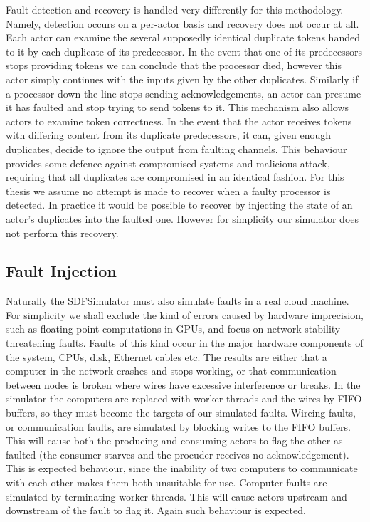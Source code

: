 Fault detection and recovery is handled very differently for this methodology.
Namely, detection occurs on a per-actor basis and recovery does not occur at all.
Each actor can examine the several supposedly identical duplicate tokens handed to it by each duplicate of its predecessor.
In the event that one of its predecessors stops providing tokens we can conclude that the processor died, however this actor simply continues with the inputs given by the other duplicates.
Similarly if a processor down the line stops sending acknowledgements, an actor can presume it has faulted and stop trying to send tokens to it.
This mechanism also allows actors to examine token correctness.
In the event that the actor receives tokens with differing content from its duplicate predecessors, it can, given enough duplicates, decide to ignore the output from faulting channels.
This behaviour provides some defence against compromised systems and malicious attack, requiring that all duplicates are compromised in an identical fashion.
For this thesis we assume no attempt is made to recover when a faulty processor is detected.
In practice it would be possible to recover by injecting the state of an actor's duplicates into the faulted one.
However for simplicity our simulator does not perform this recovery.

\subsection{Fault Injection}

Naturally the SDFSimulator must also simulate faults in a real cloud machine.
For simplicity we shall exclude the kind of errors caused by hardware imprecision, such as floating point computations in GPUs, and focus on network-stability threatening faults.
Faults of this kind occur in the major hardware components of the system, CPUs, disk, Ethernet cables etc.
The results are either that a computer in the network crashes and stops working, or that communication between nodes is broken where wires have excessive interference or breaks.
In the simulator the computers are replaced with worker threads and the wires by FIFO buffers, so they must become the targets of our simulated faults.
Wireing faults, or communication faults, are simulated by blocking writes to the FIFO buffers.
This will cause both the producing and consuming actors to flag the other as faulted (the consumer starves and the procuder receives no acknowledgement).
This is expected behaviour, since the inability of two computers to communicate with each other makes them both unsuitable for use.
Computer faults are simulated by terminating worker threads.
This will cause actors upstream and downstream of the fault to flag it.
Again such behaviour is expected.

